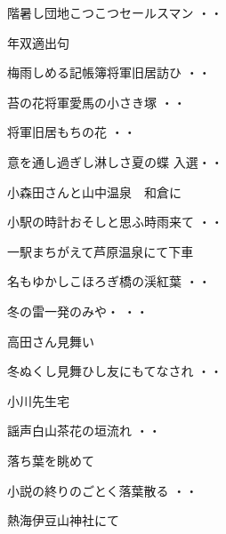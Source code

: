 \begin{shiika}階暑し団地こつこつセールスマン
\hfill{・・}\end{shiika}
\vspace{ 0.4cm}
年双適出句
\begin{shiika}梅雨しめる記帳簿将軍旧居訪ひ
\hfill{・・}\end{shiika}
\begin{shiika}苔の花将軍愛馬の小さき塚
\hfill{・・}\end{shiika}
\begin{shiika}将軍旧居もちの花
\hfill{・・}\end{shiika}
\begin{shiika}意を通し過ぎし淋しさ夏の蝶
\hfill{入選・・}\end{shiika}
\vspace{ 0.4cm}
小森田さんと山中温泉　和倉に
\begin{shiika}小駅の時計おそしと思ふ時雨来て
\hfill{・・}\end{shiika}
\vspace{ 0.4cm}
一駅まちがえて芦原温泉にて下車
\begin{shiika}名もゆかしこほろぎ橋の渓紅葉
\hfill{・・}\end{shiika}
\vspace{ 0.4cm}
\begin{shiika}冬の雷一発のみや・
\hfill{・・}\end{shiika}
\vspace{ 0.4cm}
高田さん見舞い
\begin{shiika}冬ぬくし見舞ひし友にもてなされ
\hfill{・・}\end{shiika}
\vspace{ 0.4cm}小川先生宅
\begin{shiika}謡声白山茶花の垣流れ
\hfill{・・}\end{shiika}
\vspace{ 0.4cm}
落ち葉を眺めて
\begin{shiika}小説の終りのごとく落葉散る
\hfill{・・}\end{shiika}
\vspace{ 0.4cm}
熱海伊豆山神社にて
